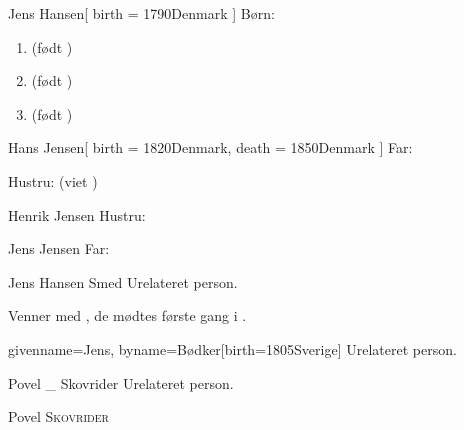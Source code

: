\documentclass[
	twocolumn
]{article}
\begin{document}
\begin{gprProfile}{Jens Hansen}[
	birth = {1790}{Denmark}
]
	Børn:
	\begin{enumerate}
	\item {} (født )
	\item {} (født )
	\item {} (født )
	\end{enumerate}

\end{gprProfile}

\begin{gprProfile}{Hans Jensen}[
	birth = {1820}{Denmark},
	death = {1850}{Denmark}
]
	Far:

	Hustru:
	 (viet )

\end{gprProfile}

\begin{gprProfile}{Henrik Jensen}
	Hustru:
	
	\lipsum[1-5]

\end{gprProfile}

\begin{gprProfile}[id=ABC]{Jens Jensen}
	Far:

\end{gprProfile}

\begin{gprProfile}{Jens Hansen Smed}
	Urelateret person.
	
	Venner med , de mødtes første gang i .

\end{gprProfile}

\begin{gprProfile*}{givenname=Jens, byname=Bødker}[birth={1805}{Sverige}]
	Urelateret person.

\end{gprProfile*}

\begin{gprProfile}{Povel _ Skovrider}
	Urelateret person.
	
	\gprStyledName
	
	{\gprGivenName{} {\scshape \gprByname}}
	
	{Povel {\scshape Skovrider}}

\end{gprProfile}
\end{document}
